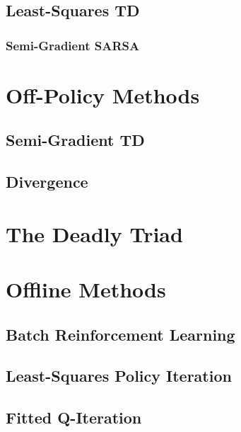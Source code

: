 		\subsection{Least-Squares TD} %

			\subsubsection{Semi-Gradient SARSA} %

	\section{Off-Policy Methods} %

		\subsection{Semi-Gradient TD} %

		\subsection{Divergence} %

	\section{The Deadly Triad} %

	\section{Offline Methods} %

		\subsection{Batch Reinforcement Learning} %

		\subsection{Least-Squares Policy Iteration} %

		\subsection{Fitted Q-Iteration} %

